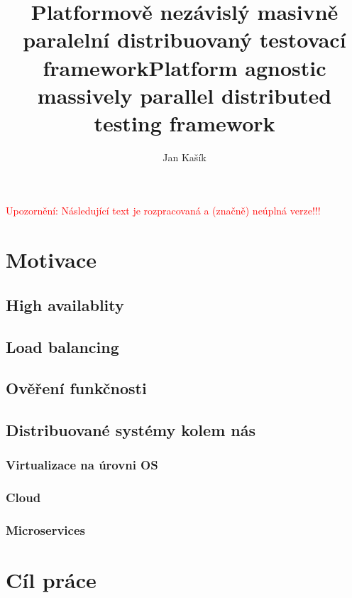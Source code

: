 \documentclass[
  master,
  field=inf,
  index
]{kidiplom}
\title{Platformově nezávislý masivně paralelní distribuovaný testovací framework}
\title[english]{Platform agnostic massively parallel distributed testing framework}
\author{Jan Kašík}
\begin{document}
\maketitle

\noindent\textcolor{red}{\LARGE Upozornění: Následující text je rozpracovaná a (značně) neúplná verze!!!}

\section{Motivace}

\subsection{High availablity}
\subsection{Load balancing}
\subsection{Ověření funkčnosti}

\subsection{Distribuované systémy kolem nás}

\subsubsection{Virtualizace na úrovni OS}

\subsubsection{Cloud}

\subsubsection{Microservices}


\section{Cíl práce}
\end{document}
